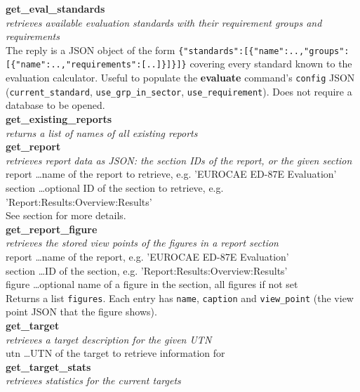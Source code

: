 \textbf{get\_eval\_standards} \\
\textit{retrieves available evaluation standards with their requirement groups and requirements} \\
The reply is a JSON object of the form
\texttt{\{"standards":[\{"name":..,"groups":[\{"name":..,"requirements":[..]\}]\}]\}}
covering every standard known to the evaluation calculator. Useful to populate
the \textbf{evaluate} command's \texttt{config} JSON
(\texttt{current\_standard}, \texttt{use\_grp\_in\_sector},
\texttt{use\_requirement}). Does not require a database to be opened. \\

\textbf{get\_existing\_reports} \\
\textit{returns a list of names of all existing reports} \\

\textbf{get\_report} \\
\textit{retrieves report data as JSON: the section IDs of the report, or the given section} \\
report \dots name of the report to retrieve, e.g. 'EUROCAE ED-87E Evaluation' \\
section \dots optional ID of the section to retrieve, e.g. 'Report:Results:Overview:Results' \\
See section  for more details. \\

\textbf{get\_report\_figure} \\
\textit{retrieves the stored view points of the figures in a report section} \\
report \dots name of the report, e.g. 'EUROCAE ED-87E Evaluation' \\
section \dots ID of the section, e.g. 'Report:Results:Overview:Results' \\
figure \dots optional name of a figure in the section, all figures if not set \\
Returns a list \texttt{figures}. Each entry has \texttt{name}, \texttt{caption} and \texttt{view\_point} (the view point JSON that the figure shows). \\

\textbf{get\_target} \\
\textit{retrieves a target description for the given UTN} \\
utn \dots UTN of the target to retrieve information for \\

\textbf{get\_target\_stats} \\
\textit{retrieves statistics for the current targets} \\

